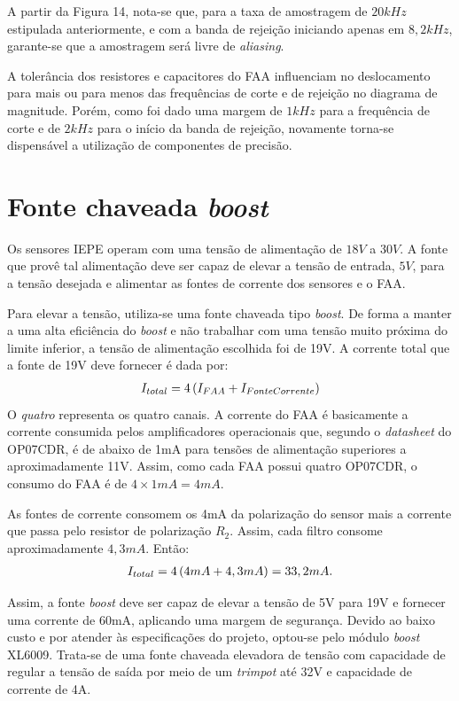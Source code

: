 \documentclass[11pt]{abntex2}
\begin{document}
			A partir da Figura 14, nota-se que, para a taxa de amostragem de
			$20kHz$ estipulada anteriormente, e com a banda de rejeição
			iniciando apenas em $8,2kHz$, garante-se que a amostragem será
			livre de \textit{aliasing}.

			A tolerância dos resistores e capacitores do FAA influenciam no
			deslocamento para mais ou para menos das frequências de corte e
			de rejeição no diagrama de magnitude. Porém, como foi dado uma
			margem de $1kHz$ para a frequência de corte e de $2kHz$ para o
			início da banda de rejeição, novamente torna-se dispensável a
			utilização de componentes de precisão.

		\section{Fonte chaveada \textit{boost}}
			Os sensores IEPE operam com uma tensão de alimentação de $18V$ a
			$30V$. A fonte que provê tal alimentação deve ser capaz de
			elevar a tensão de entrada, $5V$, para a tensão desejada e
			alimentar as fontes de corrente dos sensores e o FAA.
			
			Para elevar a tensão, utiliza-se uma fonte chaveada tipo
			\textit{boost}. De forma a manter a uma alta eficiência do
			\textit{boost} e não trabalhar com uma tensão muito próxima do
			limite inferior, a tensão de alimentação escolhida foi de 19V.
			A corrente total que a fonte de 19V deve fornecer é dada por:
			\begin{gather*}
				I_{total} = 4\* \left(I_{FAA} + I_{FonteCorrente}\right)
			\end{gather*}
			O \textit{quatro} representa os quatro canais. A corrente do FAA
			é basicamente a corrente consumida pelos amplificadores
			operacionais que, segundo o \textit{datasheet} do OP07CDR, é de
			abaixo de 1mA para tensões de alimentação superiores a
			aproximadamente 11V. Assim, como cada FAA possui quatro OP07CDR,
			o consumo do FAA é de $4\times 1mA =  4mA$.

			As fontes de corrente consomem os 4mA da polarização do sensor
			mais a corrente que passa pelo resistor de polarização $R_2$.
			Assim, cada filtro consome aproximadamente $4,3mA$. Então:
			\begin{gather*}
				I_{total} = 4\* \left(4mA + 4,3mA\right) = 33,2mA.
			\end{gather*}

			Assim, a fonte \textit{boost} deve ser capaz de elevar a tensão
			de 5V para 19V e fornecer uma corrente de 60mA, aplicando uma
			margem de segurança. Devido ao baixo custo e por atender às
			especificações do projeto, optou-se pelo módulo \textit{boost}
			XL6009. Trata-se de uma fonte chaveada elevadora de tensão com
			capacidade de regular a tensão de saída por meio de um
			\textit{trimpot} até 32V e capacidade de corrente de 4A.
			
\end{document}
